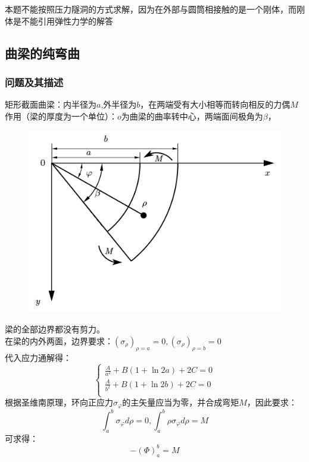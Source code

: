 	\begin{note}
		本题不能按照压力隧洞的方式求解，因为在外部与圆筒相接触的是一个刚体，而刚体是不能引用弹性力学的解答
	\end{note}

\subsection{曲梁的纯弯曲}
\subsubsection{问题及其描述}
矩形截面曲梁：内半径为$a$,外半径为$b$，在两端受有大小相等而转向相反的力偶$M$作用（梁的厚度为一个单位）：$o$为曲梁的曲率转中心，两端面间极角为$\beta$，
\begin{figure}[H]
\centering
\includegraphics[scale=0.5]{figure/4-9.png}
\caption{}
\end{figure}
梁的全部边界都没有剪力。\\
在梁的内外两面，边界要求：$\left( \sigma _{\rho} \right) _{\rho =a}=0   ,   \left( \sigma _{\rho} \right) _{\rho =b}=0$\\
代入应力通解得：\[\begin{cases}
\frac{A}{a^2}+B\left( 1+\ln 2a \right) +2C=0\\
\frac{A}{b^2}+B\left( 1+\ln 2b \right) +2C=0\\
\end{cases}\]
根据圣维南原理，环向正应力$\sigma _{\varphi}$的主矢量应当为零，并合成弯矩$M$，因此要求：\[\int_a^b{\sigma _{\varphi}d\rho}=0   ,   \int_a^b{\rho \sigma _{\varphi}d\rho}=M\]
可求得：\[-\left( \varPhi \right) _{a}^{b}=M\]
